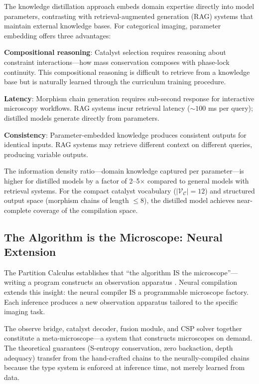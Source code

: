 \documentclass[11pt,twocolumn,a4paper]{article}
\theoremstyle{definition}
\theoremstyle{remark}
\newcommand{\catalyst}{\mathcal{C}}
\newcommand{\vocab}{\mathcal{V}}
\begin{document}
The knowledge distillation approach embeds domain expertise directly into model parameters, contrasting with retrieval-augmented generation (RAG) systems that maintain external knowledge bases. For categorical imaging, parameter embedding offers three advantages:

\textbf{Compositional reasoning}: Catalyst selection requires reasoning about constraint interactions---how mass conservation composes with phase-lock continuity. This compositional reasoning is difficult to retrieve from a knowledge base but is naturally learned through the curriculum training procedure.

\textbf{Latency}: Morphism chain generation requires sub-second response for interactive microscopy workflows. RAG systems incur retrieval latency ($\sim 100$ ms per query); distilled models generate directly from parameters.

\textbf{Consistency}: Parameter-embedded knowledge produces consistent outputs for identical inputs. RAG systems may retrieve different context on different queries, producing variable outputs.

The information density ratio---domain knowledge captured per parameter---is higher for distilled models by a factor of 2--5$\times$ compared to general models with retrieval systems. For the compact catalyst vocabulary ($|\vocab_\catalyst| = 12$) and structured output space (morphism chains of length $\leq 8$), the distilled model achieves near-complete coverage of the compilation space.

\subsection{The Algorithm is the Microscope: Neural Extension}

The Partition Calculus establishes that ``the algorithm IS the microscope''---writing a program constructs an observation apparatus \cite{partition2024}. Neural compilation extends this insight: the neural compiler IS a programmable microscope factory. Each inference produces a new observation apparatus tailored to the specific imaging task.

The observe bridge, catalyst decoder, fusion module, and CSP solver together constitute a meta-microscope---a system that constructs microscopes on demand. The theoretical guarantees (S-entropy conservation, zero backaction, depth adequacy) transfer from the hand-crafted chains to the neurally-compiled chains because the type system is enforced at inference time, not merely learned from data.
\end{document}

